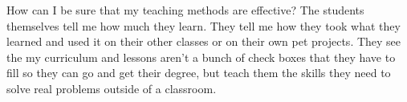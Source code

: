 \documentclass[a4paper]{article}
\begin{document}
How can I be sure that my teaching methods are effective?
The students themselves tell me how much they learn.
They tell me how they took what they learned and used it on their other classes or on their own pet projects.
They see the my curriculum and lessons aren't  a bunch of check boxes that they have to fill so they can go and get their degree, but teach them the skills they need to solve real problems outside of a classroom.
\end{document}
